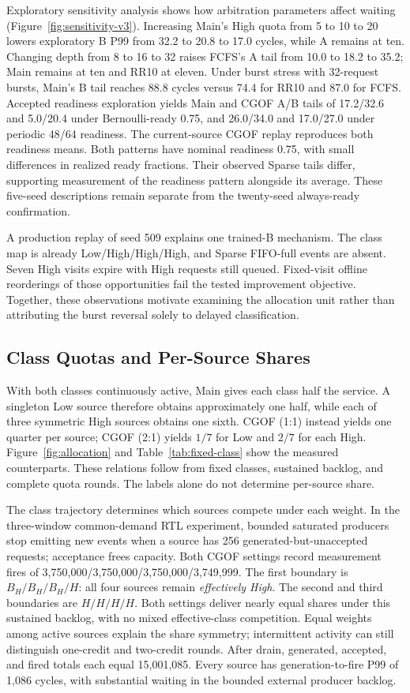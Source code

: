 Exploratory sensitivity analysis shows how arbitration parameters affect waiting (Figure~\ref{fig:sensitivity-v3}). Increasing Main's High quota from 5 to 10 to 20 lowers exploratory B P99 from 32.2 to 20.8 to 17.0 cycles, while A remains at ten. Changing depth from 8 to 16 to 32 raises FCFS's A tail from 10.0 to 18.2 to 35.2; Main remains at ten and RR10 at eleven. Under burst stress with 32-request bursts, Main's B tail reaches 88.8 cycles versus 74.4 for RR10 and 87.0 for FCFS. Accepted readiness exploration yields Main and CGOF A/B tails of 17.2/32.6 and 5.0/20.4 under Bernoulli-ready 0.75, and 26.0/34.0 and 17.0/27.0 under periodic 48/64 readiness. The current-source CGOF replay reproduces both readiness means. Both patterns have nominal readiness 0.75, with small differences in realized ready fractions. Their observed Sparse tails differ, supporting measurement of the readiness pattern alongside its average. These five-seed descriptions remain separate from the twenty-seed always-ready confirmation.

A production replay of seed 509 explains one trained-B mechanism. The class map is already Low/High/High/High, and Sparse FIFO-full events are absent. Seven High visits expire with High requests still queued. Fixed-visit offline reorderings of those opportunities fail the tested improvement objective. Together, these observations motivate examining the allocation unit rather than attributing the burst reversal solely to delayed classification.

\subsection{Class Quotas and Per-Source Shares}
\label{sec:allocation}

With both classes continuously active, Main gives each class half the service. A singleton Low source therefore obtains approximately one half, while each of three symmetric High sources obtains one sixth. CGOF (1:1) instead yields one quarter per source; CGOF (2:1) yields $1/7$ for Low and $2/7$ for each High. Figure~\ref{fig:allocation} and Table~\ref{tab:fixed-class} show the measured counterparts. These relations follow from fixed classes, sustained backlog, and complete quota rounds. The labels alone do not determine per-source share.

The class trajectory determines which sources compete under each weight. In the three-window common-demand RTL experiment, bounded saturated producers stop emitting new events when a source has 256 generated-but-unaccepted requests; acceptance frees capacity. Both CGOF settings record measurement fires of 3,750,000/3,750,000/3,750,000/3,749,999. The first boundary is $B_H/B_H/B_H/H$: all four sources remain \emph{effectively High}. The second and third boundaries are $H/H/H/H$. Both settings deliver nearly equal shares under this sustained backlog, with no mixed effective-class competition. Equal weights among active sources explain the share symmetry; intermittent activity can still distinguish one-credit and two-credit rounds. After drain, generated, accepted, and fired totals each equal 15,001,085. Every source has generation-to-fire P99 of 1,086 cycles, with substantial waiting in the bounded external producer backlog.


